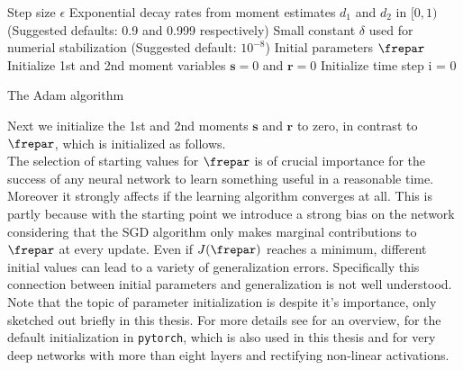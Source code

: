 \begin{algorithm}[hbp!]
	\begin{algorithmic}
		\SetAlgoLined
		\REQUIRE Step size $\epsilon$
		\REQUIRE Exponential decay rates from moment estimates $d_1$ and $d_2$ in \([0,1)\)\\
		(Suggested defaults: 0.9 and 0.999 respectively)
		\REQUIRE Small constant $\delta$ used for numerial stabilization (Suggested default: $10^{-8}$)
		\REQUIRE Initial parameters $\frepar$\\
		Initialize 1st and 2nd moment variables \(\mathbf{s}=0\) and \(\mathbf{r}=0\)\;
		Initialize time step i = 0\;
	\end{algorithmic}
	\caption{The Adam algorithm}
	\label{Alg:Adam}
\end{algorithm} 
Next we initialize the 1st and 2nd moments \(\mathbf{s}\) and \(\mathbf{r}\) to zero, in contrast to \(\frepar\), which is initialized as follows.\\
The selection of starting values for \(\frepar\) is of crucial importance for the success of any neural network to learn something useful in a reasonable time. Moreover it strongly affects if the learning algorithm converges at all. This is partly because with the starting point we introduce a strong bias on the network considering that the SGD algorithm only makes marginal contributions to \(\frepar\) at every update. Even if \(J(\frepar)\) reaches a minimum, different initial values can lead to a variety of generalization errors. Specifically this connection between initial parameters and generalization is not well understood. Note that the topic of parameter initialization is despite it's importance, only sketched out briefly in this thesis. For more details see \cite{Goodfellow} for an overview, \cite{LeCun98} for the default initialization in \texttt{pytorch}, which is also used in this thesis and \cite{he2015} for very deep networks with more than eight layers and rectifying non-linear activations.\\

